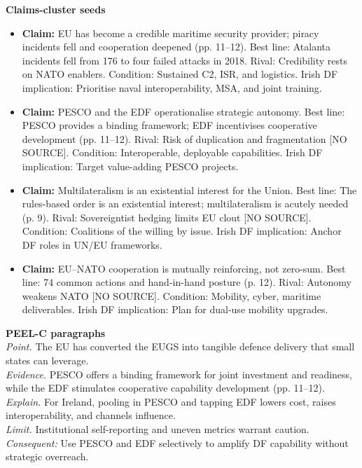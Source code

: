 \textbf{Claims-cluster seeds}
\begin{itemize}
	\item \textbf{Claim:} EU has become a credible maritime security provider; piracy incidents fell and cooperation deepened (pp. 11–12).  
	Best line: Atalanta incidents fell from 176 to four failed attacks in 2018.  
	Rival: Credibility rests on NATO enablers.  
	Condition: Sustained C2, ISR, and logistics.  
	Irish DF implication: Prioritise naval interoperability, MSA, and joint training.
	\item \textbf{Claim:} PESCO and the EDF operationalise strategic autonomy.  
	Best line: PESCO provides a binding framework; EDF incentivises cooperative development (pp. 11–12).  
	Rival: Risk of duplication and fragmentation [NO SOURCE].  
	Condition: Interoperable, deployable capabilities.  
	Irish DF implication: Target value-adding PESCO projects.
	\item \textbf{Claim:} Multilateralism is an existential interest for the Union.  
	Best line: The rules-based order is an existential interest; multilateralism is acutely needed (p. 9).  
	Rival: Sovereigntist hedging limits EU clout [NO SOURCE].  
	Condition: Coalitions of the willing by issue.  
	Irish DF implication: Anchor DF roles in UN/EU frameworks.
	\item \textbf{Claim:} EU–NATO cooperation is mutually reinforcing, not zero-sum.  
	Best line: 74 common actions and hand-in-hand posture (p. 12).  
	Rival: Autonomy weakens NATO [NO SOURCE].  
	Condition: Mobility, cyber, maritime deliverables.  
	Irish DF implication: Plan for dual-use mobility upgrades.
\end{itemize}

\textbf{PEEL-C paragraphs}\\
\textit{Point.} The EU has converted the EUGS into tangible defence delivery that small states can leverage.\\
\textit{Evidence.} PESCO offers a binding framework for joint investment and readiness, while the EDF stimulates cooperative capability development (pp. 11–12).\\
\textit{Explain.} For Ireland, pooling in PESCO and tapping EDF lowers cost, raises interoperability, and channels influence.\\
\textit{Limit.} Institutional self-reporting and uneven metrics warrant caution.\\
\textit{Consequent:} Use PESCO and EDF selectively to amplify DF capability without strategic overreach.

